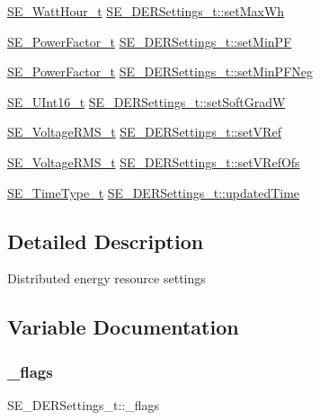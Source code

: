 \begin{DoxyCompactItemize}
\item 
\hyperlink{structSE__WattHour__t}{S\+E\+\_\+\+Watt\+Hour\+\_\+t} \hyperlink{group__DERSettings_ga73e4e2883d95a828b83ad77c478f38ae}{S\+E\+\_\+\+D\+E\+R\+Settings\+\_\+t\+::set\+Max\+Wh}
\item 
\hyperlink{structSE__PowerFactor__t}{S\+E\+\_\+\+Power\+Factor\+\_\+t} \hyperlink{group__DERSettings_ga25d7e40750e98570edb457a8b1cac5e7}{S\+E\+\_\+\+D\+E\+R\+Settings\+\_\+t\+::set\+Min\+PF}
\item 
\hyperlink{structSE__PowerFactor__t}{S\+E\+\_\+\+Power\+Factor\+\_\+t} \hyperlink{group__DERSettings_ga7fde7d061c8613af2bd0e09cd23921b5}{S\+E\+\_\+\+D\+E\+R\+Settings\+\_\+t\+::set\+Min\+P\+F\+Neg}
\item 
\hyperlink{group__UInt16_gac68d541f189538bfd30cfaa712d20d29}{S\+E\+\_\+\+U\+Int16\+\_\+t} \hyperlink{group__DERSettings_gade867ee1fb03c1773130a0d9a5743584}{S\+E\+\_\+\+D\+E\+R\+Settings\+\_\+t\+::set\+Soft\+GradW}
\item 
\hyperlink{structSE__VoltageRMS__t}{S\+E\+\_\+\+Voltage\+R\+M\+S\+\_\+t} \hyperlink{group__DERSettings_gacd6deb80264d5c3dd884a43947686301}{S\+E\+\_\+\+D\+E\+R\+Settings\+\_\+t\+::set\+V\+Ref}
\item 
\hyperlink{structSE__VoltageRMS__t}{S\+E\+\_\+\+Voltage\+R\+M\+S\+\_\+t} \hyperlink{group__DERSettings_ga9b10fd8645e30e07ce49bda49d6cefc5}{S\+E\+\_\+\+D\+E\+R\+Settings\+\_\+t\+::set\+V\+Ref\+Ofs}
\item 
\hyperlink{group__TimeType_ga6fba87a5b57829b4ff3f0e7638156682}{S\+E\+\_\+\+Time\+Type\+\_\+t} \hyperlink{group__DERSettings_gabe364d4b64a470e7b43450c099bfeeb1}{S\+E\+\_\+\+D\+E\+R\+Settings\+\_\+t\+::updated\+Time}
\end{DoxyCompactItemize}


\subsection{Detailed Description}
Distributed energy resource settings 

\subsection{Variable Documentation}
\mbox{\label{group__DERSettings_ga2c1242ff7f135c60430a5604d2f1a83a}} 
\subsubsection{\texorpdfstring{\+\_\+flags}{\_flags}}
{\footnotesize\ttfamily S\+E\+\_\+\+D\+E\+R\+Settings\+\_\+t\+::\+\_\+flags}

